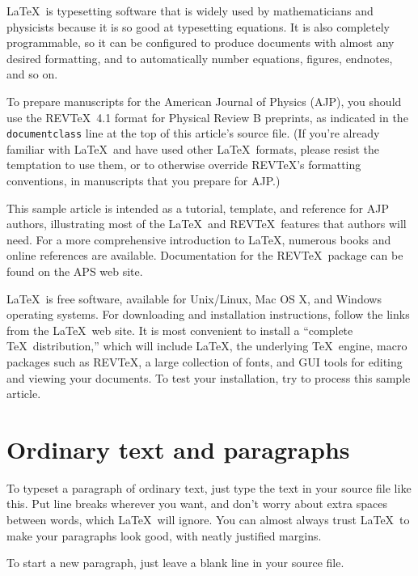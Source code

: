 \documentclass[prb,preprint]{revtex4-1}
\begin{document}
\LaTeX\ is typesetting software that is widely used by mathematicians
and physicists because it is so good at typesetting equations. It is 
also completely programmable, so it can be configured to produce 
documents with almost any desired formatting, and to automatically
number equations, figures, endnotes, and so on.

To prepare manuscripts for the American Journal of Physics (AJP), 
you should use the REV\TeX\ 4.1 format for Physical Review B
preprints, as indicated in the \texttt{documentclass} line at the top 
of this article's source file.  (If you're already familiar with 
\LaTeX\ and have used other \LaTeX\ formats, please resist the 
temptation to use them, or to otherwise override REV\TeX's formatting 
conventions, in manuscripts that you prepare for AJP.)

This sample article is intended as a tutorial, template, and reference for 
AJP authors, illustrating most of the \LaTeX\ and REV\TeX\ features that 
authors will need.  For a more comprehensive introduction to \LaTeX, 
numerous books and online references are available.\cite{latexsite, 
wikibook, latexbook}  Documentation for the REV\TeX\ package 
can be found on the APS web site.\cite{revtex}

\LaTeX\ is free software, available for Unix/Linux, Mac OS X, and Windows
operating systems. For downloading and installation instructions, follow
the links from the \LaTeX\ web site.\cite{latexsite} It is most
convenient\cite{cloudLaTeX} to install a ``complete \TeX\ distribution,'' 
which will include \LaTeX, the underlying \TeX\ engine, macro packages 
such as REV\TeX, a large collection of fonts, and GUI tools for editing 
and viewing your documents.  To test your installation, try to process
this sample article.


\section{Ordinary text and paragraphs}

To typeset a paragraph of ordinary text, just type the text in your source
file like this. Put line breaks
wherever
you
want, and don't      worry      about      extra      spaces      between      words, which \LaTeX\ will ignore.  You can almost always trust \LaTeX\ to make your paragraphs look good, with neatly justified margins.  %

To start a new paragraph, just leave a blank line in your source file.
\end{document}
